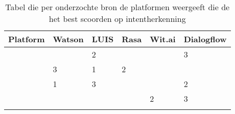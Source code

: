 \begin{center}
    \begin{longtable}{| l | l | l | l | l | l |}
        \hline
        \textbf{Platform } &  \textbf{Watson} & \textbf{LUIS} & \textbf{Rasa}& \textbf{Wit.ai} & \textbf{Dialogflow} \\  \hline
        \textbf{\textcite{Russis2018}} & \cellcolor[rgb]{1,0.8431,0} \centering{1} & \cellcolor[rgb]{0.7529,0.7529,0.7529} 2 & & & \cellcolor[rgb]{0.80,0.50,0.20} 3 \\ \hline
        \textbf{\textcite{Langen2017}} & \cellcolor[rgb]{0.80,0.50,0.20} 3 & \cellcolor[rgb]{1,0.8431,0} 1 & \cellcolor[rgb]{0.7529,0.7529,0.7529} 2 & & \\ \hline
        \textbf{\textcite{Savenkov2017}} & \cellcolor[rgb]{1,0.8431,0} 1 & \cellcolor[rgb]{0.80,0.50,0.20} 3 & & & \cellcolor[rgb]{0.7529,0.7529,0.7529} 2 \\ \hline
        \textbf{\textcite{Coucke2017}} & & & & \cellcolor[rgb]{0.7529,0.7529,0.7529} 2 & \cellcolor[rgb]{0.80,0.50,0.20} 3 \\ \hline 
        \caption{Tabel die per onderzochte bron de platformen weergeeft die de het best scoorden op intentherkenning}                                    
    \end{longtable}
\end{center}














